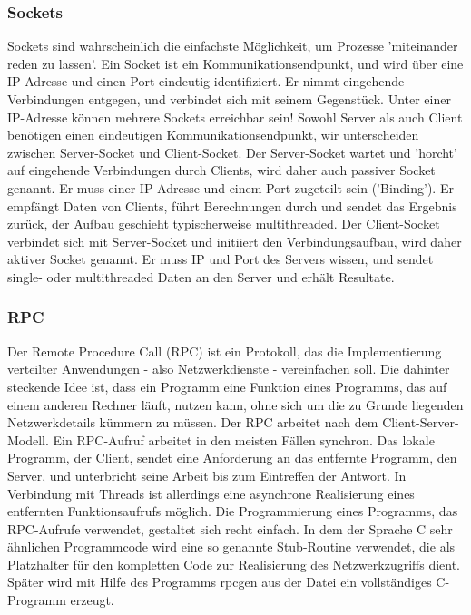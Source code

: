 \documentclass[letterpaper, 12pt]{article}
\let\tempsubsubsection\subsubsection
\renewcommand\subsubsection[1]{\vspace{0cm}\tempsubsubsection{#1}\vspace{0cm}}
\begin{document}
\subsubsection{Sockets}

Sockets sind wahrscheinlich die einfachste Möglichkeit, um Prozesse 'miteinander reden zu lassen'. Ein Socket ist ein Kommunikationsendpunkt, und wird über eine IP-Adresse und einen Port eindeutig identifiziert. Er nimmt eingehende Verbindungen entgegen, und verbindet sich mit seinem Gegenstück. Unter einer IP-Adresse können mehrere Sockets erreichbar sein! Sowohl Server als auch Client
benötigen einen eindeutigen Kommunikationsendpunkt, wir unterscheiden zwischen
Server-Socket und Client-Socket. Der Server-Socket wartet und 'horcht' auf eingehende
Verbindungen durch Clients, wird daher auch passiver Socket genannt. Er muss einer IP-Adresse und einem Port zugeteilt sein ('Binding'). Er empfängt Daten von Clients, führt Berechnungen
durch und sendet das Ergebnis zurück, der Aufbau geschieht typischerweise multithreaded. Der Client-Socket verbindet sich mit Server-Socket und initiiert den Verbindungsaufbau, wird daher aktiver Socket genannt. Er muss IP und Port des Servers wissen, und sendet single- oder multithreaded Daten an den Server und erhält Resultate. \cite{socketslides}

\subsubsection{RPC}

Der Remote Procedure Call (RPC) ist ein Protokoll, das die Implementierung verteilter Anwendungen - also Netzwerkdienste - vereinfachen soll. Die dahinter steckende Idee ist, dass ein Programm eine Funktion eines Programms, das auf einem anderen Rechner läuft, nutzen kann, ohne sich um die zu Grunde liegenden Netzwerkdetails kümmern zu müssen. Der RPC arbeitet nach dem Client-Server-Modell. Ein RPC-Aufruf arbeitet in den meisten Fällen synchron. Das lokale Programm, der Client, sendet eine Anforderung an das entfernte Programm, den Server, und unterbricht seine Arbeit bis zum Eintreffen der Antwort. In Verbindung mit Threads ist allerdings eine asynchrone Realisierung eines entfernten Funktionsaufrufs möglich. Die Programmierung eines Programms, das RPC-Aufrufe verwendet, gestaltet sich recht einfach. In dem der Sprache C sehr ähnlichen Programmcode wird eine so genannte Stub-Routine verwendet, die als Platzhalter für den kompletten Code zur Realisierung des Netzwerkzugriffs dient. Später wird mit Hilfe des Programms rpcgen aus der Datei ein vollständiges C-Programm erzeugt. \citep{rpc}
\end{document}
